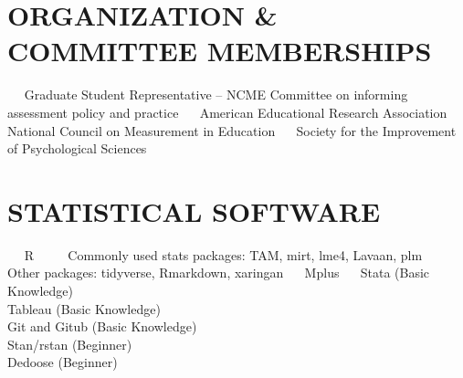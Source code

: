 \documentclass[11pt, oneside]{memoir}
\begin{document}
\hypertarget{organization-committee-memberships}{%
\section{ORGANIZATION \& COMMITTEE
MEMBERSHIPS}\label{organization-committee-memberships}}

~~ Graduate Student Representative -- NCME Committee on informing
assessment policy and practice ~~ American Educational Research
Association ~~ National Council on Measurement in Education ~~ Society
for the Improvement of Psychological Sciences

\vspace{7mm}

\hypertarget{statistical-software}{%
\section{STATISTICAL SOFTWARE}\label{statistical-software}}

~~ R ~~~~ Commonly used stats packages: TAM, mirt, lme4, Lavaan, plm
~~~~ Other packages: tidyverse, Rmarkdown, xaringan ~~ Mplus ~~ Stata
(Basic Knowledge)\\
\hspace*{0.333em}\hspace*{0.333em} Tableau (Basic Knowledge)\\
\hspace*{0.333em}\hspace*{0.333em} Git and Gitub (Basic Knowledge)\\
\hspace*{0.333em}\hspace*{0.333em} Stan/rstan (Beginner)\\
\hspace*{0.333em}\hspace*{0.333em} Dedoose (Beginner)
\end{document}
